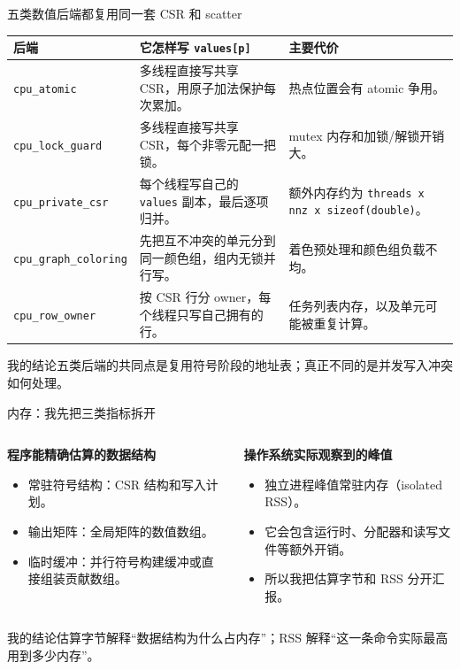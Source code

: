 \documentclass[UTF8,aspectratio=169,10pt]{ctexbeamer}
\newcommand{\code}[1]{\texttt{#1}}
\newcommand{\sourcecn}[1]{\vspace{0.2em}{\scriptsize\textcolor{pgsaGray}{数据来源：#1}}}
\newcommand{\mytake}[1]{\begin{block}{我的结论}#1\end{block}}
\begin{document}
\begin{frame}{五类数值后端都复用同一套 CSR 和 scatter}
\scriptsize
\begin{adjustbox}{max width=\textwidth}
\begin{tabularx}{\textwidth}{lX X}
\toprule
后端 & 它怎样写 \code{values[p]} & 主要代价 \\
\midrule
\code{cpu\_atomic} & 多线程直接写共享 CSR，用原子加法保护每次累加。 & 热点位置会有 atomic 争用。 \\
\code{cpu\_lock\_guard} & 多线程直接写共享 CSR，每个非零元配一把锁。 & mutex 内存和加锁/解锁开销大。 \\
\code{cpu\_private\_csr} & 每个线程写自己的 \code{values} 副本，最后逐项归并。 & 额外内存约为 \code{threads x nnz x sizeof(double)}。 \\
\code{cpu\_graph\_coloring} & 先把互不冲突的单元分到同一颜色组，组内无锁并行写。 & 着色预处理和颜色组负载不均。 \\
\code{cpu\_row\_owner} & 按 CSR 行分 owner，每个线程只写自己拥有的行。 & 任务列表内存，以及单元可能被重复计算。 \\
\bottomrule
\end{tabularx}
\end{adjustbox}
\mytake{五类后端的共同点是复用符号阶段的地址表；真正不同的是并发写入冲突如何处理。}
\sourcecn{numeric\_assembly\_algorithm\_rehearsal.md; docs/cpu/cpu\_algorithms.md}
\end{frame}

\begin{frame}{内存：我先把三类指标拆开}
\begin{columns}[T,onlytextwidth]
\begin{column}{0.49\textwidth}
\textbf{程序能精确估算的数据结构}
\begin{itemize}
  \item 常驻符号结构：CSR 结构和写入计划。
  \item 输出矩阵：全局矩阵的数值数组。
  \item 临时缓冲：并行符号构建缓冲或直接组装贡献数组。
\end{itemize}
\end{column}
\begin{column}{0.47\textwidth}
\textbf{操作系统实际观察到的峰值}
\begin{itemize}
  \item 独立进程峰值常驻内存（isolated RSS）。
  \item 它会包含运行时、分配器和读写文件等额外开销。
  \item 所以我把估算字节和 RSS 分开汇报。
\end{itemize}
\end{column}
\end{columns}
\mytake{估算字节解释“数据结构为什么占内存”；RSS 解释“这一条命令实际最高用到多少内存”。}
\end{frame}
\end{document}
